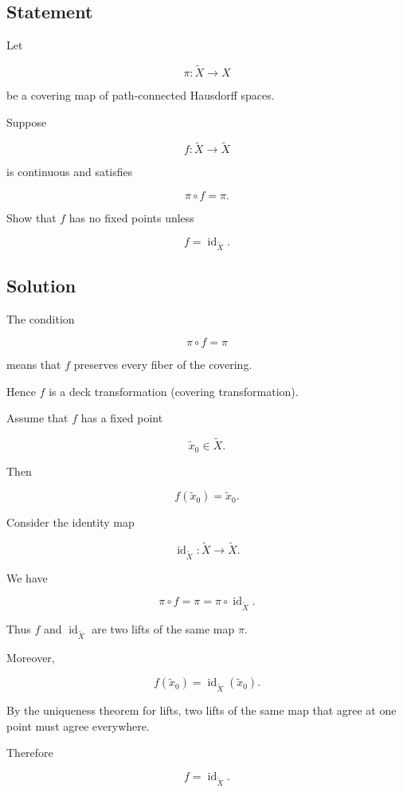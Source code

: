 \documentclass[12pt,a4paper]{article}
\theoremstyle{notespace}
\begin{document}
\subsection*{Statement}

Let

\[
\pi:\widetilde X\to X
\]

be a covering map of path-connected Hausdorff spaces.

Suppose

\[
f:\widetilde X\to\widetilde X
\]

is continuous and satisfies

\[
\pi\circ f=\pi.
\]

Show that \(f\) has no fixed points unless

\[
f=\operatorname{id}_{\widetilde X}.
\]

\subsection*{Solution}

The condition

\[
\pi\circ f=\pi
\]

means that \(f\) preserves every fiber of the covering.

Hence \(f\) is a deck transformation (covering transformation).

Assume that \(f\) has a fixed point

\[
\widetilde x_0\in\widetilde X.
\]

Then

\[
f(\widetilde x_0)=\widetilde x_0.
\]

Consider the identity map

\[
\operatorname{id}_{\widetilde X}:\widetilde X\to\widetilde X.
\]

We have

\[
\pi\circ f=\pi
=
\pi\circ \operatorname{id}_{\widetilde X}.
\]

Thus \(f\) and \(\operatorname{id}_{\widetilde X}\) are two lifts of the same map \(\pi\).

Moreover,

\[
f(\widetilde x_0)
=
\operatorname{id}_{\widetilde X}(\widetilde x_0).
\]

By the uniqueness theorem for lifts, two lifts of the same map that agree at one point must agree everywhere.

Therefore

\[
f=\operatorname{id}_{\widetilde X}.
\]
\end{document}
